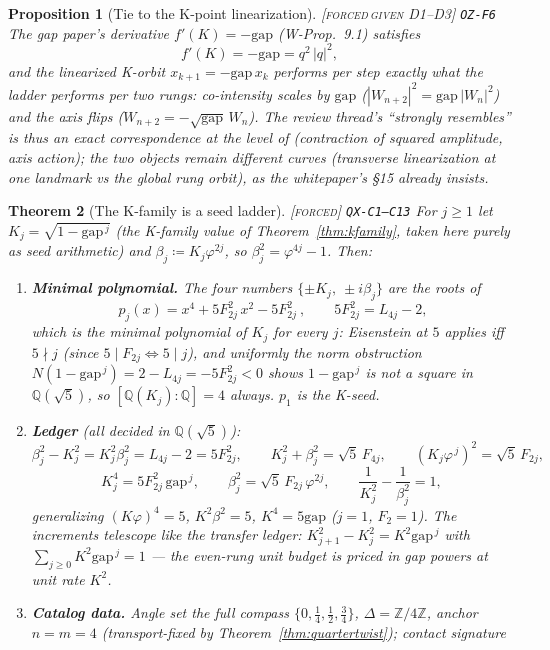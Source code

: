 \documentclass[11pt]{article}
\newcommand{\tagF}{\textcolor{cF}{\textsc{[forced]}}}
\newcommand{\tagFD}{\textcolor{cF}{\textsc{[forced}}\,\textcolor{cD}{\textsc{given D1--D3]}}}
\newcommand{\hx}[1]{\textcolor{cC}{\footnotesize\texttt{#1}}}
\newcommand{\Q}{\mathbb{Q}}
\newcommand{\Z}{\mathbb{Z}}
\newcommand{\gp}{\varphi}
\newcommand{\gapc}{\mathrm{gap}}
\theoremstyle{plain}
\newtheorem{theorem}{Theorem}[section]
\newtheorem{proposition}[theorem]{Proposition}
\theoremstyle{definition}
\theoremstyle{remark}
\begin{document}
\begin{proposition}[Tie to the K-point linearization]\label{prop:linearization}\tagFD{} \hx{OZ-F6}
The gap paper's derivative $f'(K)=-\gapc$ (W-Prop.\ 9.1) satisfies
\[
f'(K)=-\gapc=q^2\,|q|^2 ,
\]
and the linearized K-orbit $x_{k+1}=-\gapc\,x_k$ performs per step exactly what
the ladder performs per two rungs: co-intensity scales by $\gapc$
($|W_{n+2}|^2=\gapc\,|W_n|^2$) and the axis flips ($W_{n+2}=-\sqrt{\gapc}\,W_n$).
The review thread's ``strongly resembles'' is thus an exact correspondence at the
level of (contraction of squared amplitude, axis action); the two objects remain
different curves (transverse linearization at one landmark vs the global rung
orbit), as the whitepaper's \S15 already insists.
\end{proposition}

\begin{theorem}[The K-family is a seed ladder]\label{thm:kseedladder}\tagF{} \hx{QX-C1--C13}
For $j\ge1$ let $K_j=\sqrt{1-\gapc^{\,j}}$ (the K-family value of
Theorem~\ref{thm:kfamily}, taken here purely as seed arithmetic) and
$\beta_j\coloneqq K_j\gp^{2j}$, so $\beta_j^2=\gp^{4j}-1$. Then:
\begin{enumerate}[nosep,label=(\alph*)]
\item \textbf{Minimal polynomial.} The four numbers
$\{\pm K_j,\ \pm i\beta_j\}$ are the roots of
\[
\boxed{\ p_j(x)=x^4+5F_{2j}^2\,x^2-5F_{2j}^2\ },
\qquad 5F_{2j}^2=L_{4j}-2 ,
\]
which is the minimal polynomial of $K_j$ for \emph{every} $j$: Eisenstein
at $5$ applies iff $5\nmid j$ (since $5\mid F_{2j}\iff5\mid j$), and
uniformly the norm obstruction
$N(1-\gapc^{\,j})=2-L_{4j}=-5F_{2j}^2<0$ shows $1-\gapc^{\,j}$ is not a
square in $\Q(\sqrt5)$, so $[\Q(K_j):\Q]=4$ always. $p_1$ is the K-seed.
\item \textbf{Ledger} (all decided in $\Q(\sqrt5)$):
\[
\beta_j^2-K_j^2 = K_j^2\beta_j^2 = L_{4j}-2 = 5F_{2j}^2,
\qquad
K_j^2+\beta_j^2=\sqrt5\,F_{4j},
\qquad
(K_j\gp^{\,j})^2=\sqrt5\,F_{2j},
\]
\[
K_j^4=5F_{2j}^2\,\gapc^{\,j},
\qquad
\beta_j^2=\sqrt5\,F_{2j}\,\gp^{2j},
\qquad
\frac1{K_j^2}-\frac1{\beta_j^2}=1 ,
\]
generalizing $(K\gp)^4=5$, $K^2\beta^2=5$, $K^4=5\gapc$ ($j=1$, $F_2=1$).
The increments telescope like the transfer ledger:
$K_{j+1}^2-K_j^2=K^2\gapc^{\,j}$ with $\sum_{j\ge0}K^2\gapc^{\,j}=1$ ---
the even-rung unit budget is priced in gap powers at unit rate $K^2$.
\item \textbf{Catalog data.} Angle set the full compass
$\{0,\tfrac14,\tfrac12,\tfrac34\}$, $\Delta=\Z/4\Z$, anchor $n=m=4$
(transport-fixed by Theorem~\ref{thm:quartertwist}); contact signature

\end{enumerate}
\end{theorem}
\end{document}
